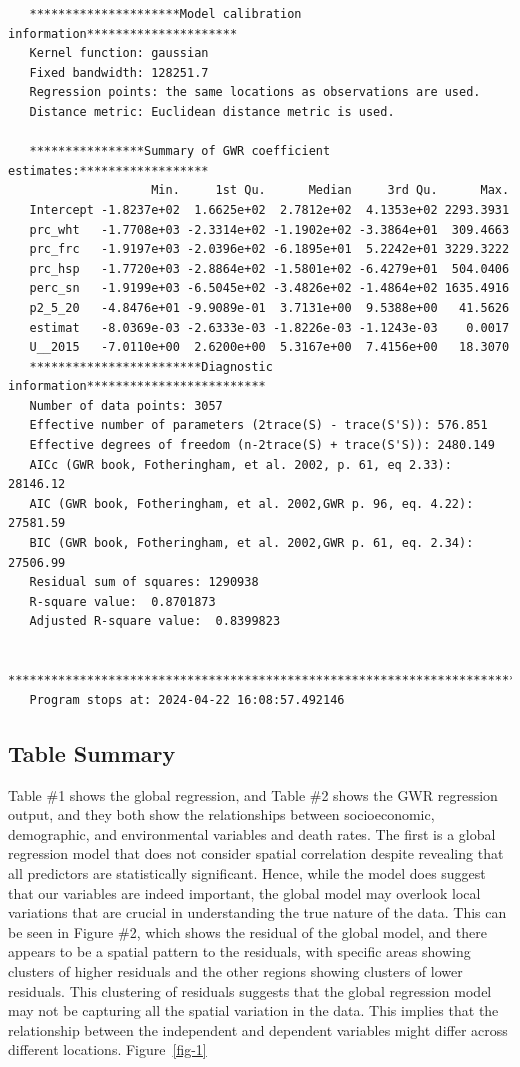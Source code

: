 \documentclass[
]{article}
\begin{document}
\begin{verbatim}
   *********************Model calibration information*********************
   Kernel function: gaussian 
   Fixed bandwidth: 128251.7 
   Regression points: the same locations as observations are used.
   Distance metric: Euclidean distance metric is used.

   ****************Summary of GWR coefficient estimates:******************
                    Min.     1st Qu.      Median     3rd Qu.      Max.
   Intercept -1.8237e+02  1.6625e+02  2.7812e+02  4.1353e+02 2293.3931
   prc_wht   -1.7708e+03 -2.3314e+02 -1.1902e+02 -3.3864e+01  309.4663
   prc_frc   -1.9197e+03 -2.0396e+02 -6.1895e+01  5.2242e+01 3229.3222
   prc_hsp   -1.7720e+03 -2.8864e+02 -1.5801e+02 -6.4279e+01  504.0406
   perc_sn   -1.9199e+03 -6.5045e+02 -3.4826e+02 -1.4864e+02 1635.4916
   p2_5_20   -4.8476e+01 -9.9089e-01  3.7131e+00  9.5388e+00   41.5626
   estimat   -8.0369e-03 -2.6333e-03 -1.8226e-03 -1.1243e-03    0.0017
   U__2015   -7.0110e+00  2.6200e+00  5.3167e+00  7.4156e+00   18.3070
   ************************Diagnostic information*************************
   Number of data points: 3057 
   Effective number of parameters (2trace(S) - trace(S'S)): 576.851 
   Effective degrees of freedom (n-2trace(S) + trace(S'S)): 2480.149 
   AICc (GWR book, Fotheringham, et al. 2002, p. 61, eq 2.33): 28146.12 
   AIC (GWR book, Fotheringham, et al. 2002,GWR p. 96, eq. 4.22): 27581.59 
   BIC (GWR book, Fotheringham, et al. 2002,GWR p. 61, eq. 2.34): 27506.99 
   Residual sum of squares: 1290938 
   R-square value:  0.8701873 
   Adjusted R-square value:  0.8399823 

   ***********************************************************************
   Program stops at: 2024-04-22 16:08:57.492146 
\end{verbatim}

\subsection{Table Summary}\label{table-summary}

Table \#1 shows the global regression, and Table \#2 shows the GWR
regression output, and they both show the relationships between
socioeconomic, demographic, and environmental variables and death rates.
The first is a global regression model that does not consider spatial
correlation despite revealing that all predictors are statistically
significant. Hence, while the model does suggest that our variables are
indeed important, the global model may overlook local variations that
are crucial in understanding the true nature of the data. This can be
seen in Figure \#2, which shows the residual of the global model, and
there appears to be a spatial pattern to the residuals, with specific
areas showing clusters of higher residuals and the other regions showing
clusters of lower residuals. This clustering of residuals suggests that
the global regression model may not be capturing all the spatial
variation in the data. This implies that the relationship between the
independent and dependent variables might differ across different
locations. Figure~\ref{fig-1}
\end{document}
